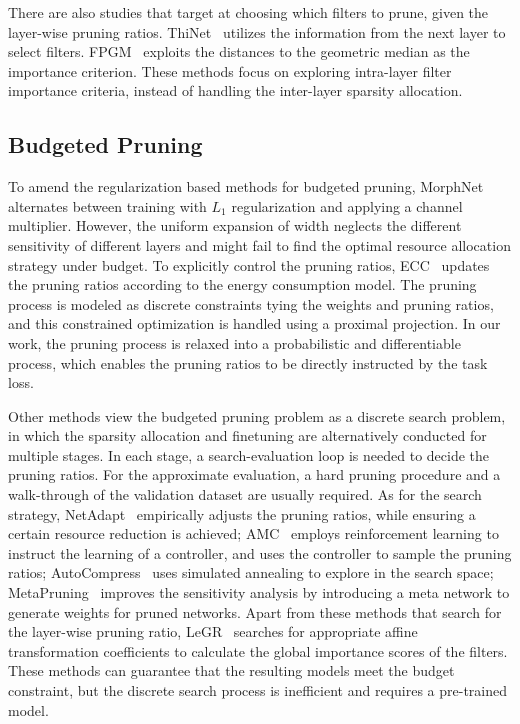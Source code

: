 \documentclass[runningheads]{llncs}
\begin{document}
  
  There are also studies that target at choosing which filters to prune, given the layer-wise pruning ratios. ThiNet~\cite{luo2017thinet} utilizes the information from the next layer to select filters. 
  FPGM~\cite{fpgm} exploits the distances to the geometric median as the importance criterion. These methods focus on exploring intra-layer filter importance criteria, instead of handling the inter-layer sparsity allocation.
  

  \subsection{Budgeted Pruning}
  
  To amend the regularization based methods for budgeted pruning, MorphNet~\cite{morphnet} alternates between training with $L_1$ regularization and applying a channel multiplier. 
  However, the uniform expansion of width neglects the different sensitivity of different layers and might fail to find the optimal resource allocation strategy under budget. To explicitly control the pruning ratios, ECC~\cite{ecc}
  updates the pruning ratios according to the energy consumption model. The pruning process is modeled as discrete constraints tying the weights and pruning ratios, and this constrained optimization is handled using a proximal projection. In our work, the pruning process is relaxed into a probabilistic and differentiable process, which enables the pruning ratios to be directly instructed by the task loss.
  
  Other methods view the budgeted pruning problem as a discrete search problem, in which the sparsity allocation and finetuning are alternatively conducted for multiple stages. In each stage, a search-evaluation loop is needed to decide the pruning ratios. 
  For the approximate evaluation, a hard pruning procedure and a walk-through of the validation dataset are usually required. 
  As for the search strategy, NetAdapt~\cite{netadapt} empirically adjusts the pruning ratios, while ensuring a certain resource reduction is achieved;
  AMC~\cite{amc} employs reinforcement learning to instruct the learning of a controller, and uses the controller to sample the pruning ratios; AutoCompress~\cite{autocompress} uses simulated annealing to explore in the search space; 
  MetaPruning~\cite{liu2019metapruning} improves the sensitivity analysis by introducing a meta network to generate weights for pruned networks.
  Apart from these methods that search for the layer-wise pruning ratio,  LeGR~\cite{legr} searches for appropriate affine transformation coefficients to calculate the global importance scores of the filters.
  These methods can guarantee that the resulting models meet the budget constraint, but the discrete search process is inefficient and requires a pre-trained model.
  
\end{document}

